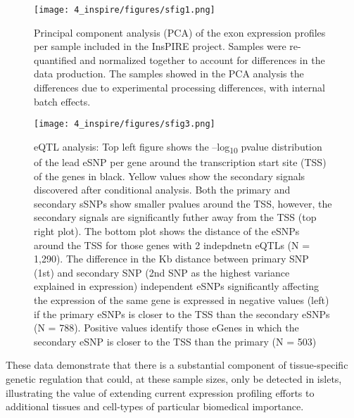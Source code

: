 \begin{figure}
    \centering
    \texttt{[image: 4\_inspire/figures/sfig1.png]}
    \caption[Principal component analysis (PCA) of the exon expression profiles per sample included in the InsPIRE project]{Principal component analysis (PCA) of the exon expression profiles per sample included in the InsPIRE project. Samples were re-quantified and normalized together to account for differences in the data production. The samples showed in the PCA analysis the differences due to experimental processing differences, with internal batch effects.}
    \label{fig:c4_sf1}
\end{figure}


\begin{figure}
    \centering
    \texttt{[image: 4\_inspire/figures/sfig3.png]}
    \caption[eQTL analysis]{eQTL analysis: Top left figure shows the –log\textsubscript{10} pvalue distribution of the lead eSNP per gene around the transcription start site (TSS) of the genes in black. Yellow values show the secondary signals discovered after conditional analysis. Both the primary and secondary sSNPs show smaller pvalues around the TSS, however, the secondary signals are significantly futher away from the TSS (top right plot). The bottom plot shows the distance of the eSNPs around the TSS for those genes with 2 indepdnetn eQTLs (N = 1,290). The difference in the Kb distance between primary SNP (1st) and secondary SNP (2nd SNP as the highest variance explained in expression) independent eSNPs significantly affecting the expression of the same gene is expressed in negative values (left) if the primary eSNPs is closer to the TSS than the secondary eSNPs (N = 788). Positive values identify those eGenes in which the secondary eSNP is closer to the TSS than the primary (N = 503)}
    \label{fig:c4_sf3}
\end{figure}


These data demonstrate that there is a substantial component of tissue-specific genetic regulation that could, at these sample sizes, only be detected in islets, illustrating the value of extending current expression profiling efforts to additional tissues and cell-types of particular biomedical importance. 

